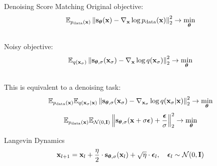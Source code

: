 \documentclass{beamer}
\begin{document}
\begin{frame}{Denoising Score Matching}
	Original objective:
	\vspace{-0.2cm}
	\[
		\mathbb{E}_{p_{\text{data}}(\mathbf{x})}\left\| \mathbf{s}_{\boldsymbol{\theta}}(\mathbf{x}) - \nabla_{\mathbf{x}} \log p_{\text{data}}(\mathbf{x}) \right\|_2^2 \rightarrow \min_{\boldsymbol{\theta}}
	\]
    \eqpause
	\vspace{-0.5cm} \\
	Noisy objective:
	\vspace{-0.2cm}
	\[
		\mathbb{E}_{q(\mathbf{x}_{\sigma})}\left\| \mathbf{s}_{\boldsymbol{\theta}, \sigma}(\mathbf{x}_\sigma) - \nabla_{\mathbf{x}} \log q(\mathbf{x}_{\sigma}) \right\|_2^2 \rightarrow \min_{\boldsymbol{\theta}}
	\]
    \eqpause
	\vspace{-0.5cm} \\
	This is equivalent to a denoising task:
	\vspace{-0.2cm}
	\[
		\mathbb{E}_{p_{\text{data}}(\mathbf{x})} \mathbb{E}_{q(\mathbf{x}_{\sigma} | \mathbf{x})}\left\| \mathbf{s}_{\boldsymbol{\theta}, \sigma}(\mathbf{x}_{\sigma}) - \nabla_{\mathbf{x}_{\sigma}} \log q(\mathbf{x}_{\sigma} | \mathbf{x}) \right\|_2^2 \rightarrow \min_{\boldsymbol{\theta}}
	\]
    \eqpause
	\vspace{-0.3cm}
	\[
		\mathbb{E}_{p_{\text{data}}(\mathbf{x})} \mathbb{E}_{\mathcal{N}(0, \mathbf{I})}\left\| \mathbf{s}_{\boldsymbol{\theta}, \sigma}(\mathbf{x} + \sigma \boldsymbol{\epsilon}) + \frac{\boldsymbol{\epsilon}}{\sigma} \right\|_2^2 \rightarrow \min_{\boldsymbol{\theta}}
	\]
    \eqpause
	\vspace{-0.5cm}
	\begin{block}{Langevin Dynamics}
		\vspace{-0.3cm}
		\[
			\mathbf{x}_{l + 1} = \mathbf{x}_l + \frac{\eta}{2} \cdot \mathbf{s}_{\boldsymbol{\theta}, \sigma}(\mathbf{x}_l) + \sqrt{\eta} \cdot \boldsymbol{\epsilon}_l, \quad \boldsymbol{\epsilon}_l \sim \mathcal{N}(0, \mathbf{I})
		\]
		\vspace{-0.7cm}
	\end{block}
\end{frame}
\end{document}
